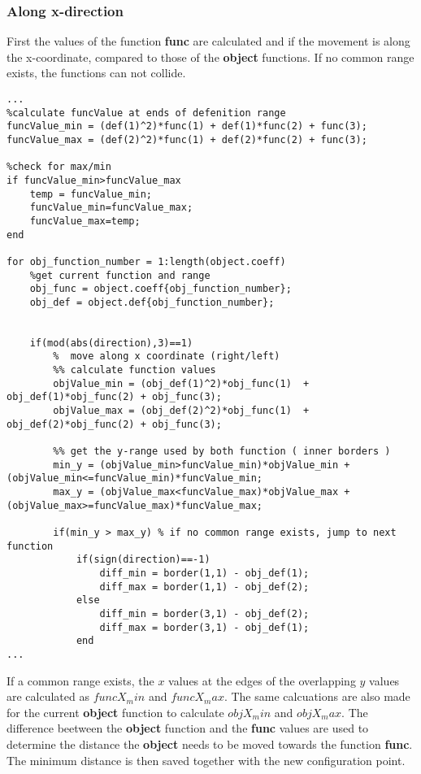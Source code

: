 \subsubsection{Along x-direction}
First the values of the function \textbf{func} are calculated and if the movement is along the x-coordinate, compared to those of the \textbf{object} functions. If no common range exists, the functions can not collide.
\begin{lstlisting}
...
%calculate funcValue at ends of defenition range
funcValue_min = (def(1)^2)*func(1) + def(1)*func(2) + func(3);
funcValue_max = (def(2)^2)*func(1) + def(2)*func(2) + func(3);

%check for max/min
if funcValue_min>funcValue_max
    temp = funcValue_min;
    funcValue_min=funcValue_max;
    funcValue_max=temp;
end

for obj_function_number = 1:length(object.coeff)
    %get current function and range
    obj_func = object.coeff{obj_function_number};
    obj_def = object.def{obj_function_number};
    
 
    if(mod(abs(direction),3)==1)
        %  move along x coordinate (right/left)
        %% calculate function values
        objValue_min = (obj_def(1)^2)*obj_func(1)  + obj_def(1)*obj_func(2) + obj_func(3);
        objValue_max = (obj_def(2)^2)*obj_func(1)  + obj_def(2)*obj_func(2) + obj_func(3);
        
        %% get the y-range used by both function ( inner borders )
        min_y = (objValue_min>funcValue_min)*objValue_min + (objValue_min<=funcValue_min)*funcValue_min;
        max_y = (objValue_max<funcValue_max)*objValue_max + (objValue_max>=funcValue_max)*funcValue_max;
        
        if(min_y > max_y) % if no common range exists, jump to next function
            if(sign(direction)==-1)
                diff_min = border(1,1) - obj_def(1);
                diff_max = border(1,1) - obj_def(2);
            else
                diff_min = border(3,1) - obj_def(2);
                diff_max = border(3,1) - obj_def(1);
            end
...
\end{lstlisting}
 If a common range exists, the $x$ values at the edges of the overlapping $y$ values are calculated as $funcX_min$ and $funcX_max$.
The same calcuations are also made for the current \textbf{object} function to calculate $objX_min$ and $objX_max$. The difference beetween the \textbf{object} function and the \textbf{func} values are used to determine the distance the \textbf{object} needs to be moved towards the function \textbf{func}. The minimum distance is then saved together with the new configuration point.

